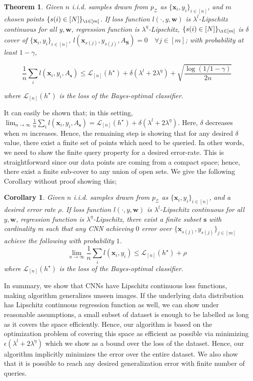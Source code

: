 \documentclass{article}
\newtheorem{theorem}{Theorem}
\newtheorem{cor}{Corollary}
\begin{document}
\begin{theorem}
Given $n$ i.i.d. samples drawn from $p_\mathcal{Z}$ as $\{\mathbf{x}_i,y_i\}_{i\in[n]}$, and $m$ chosen points $\{ s(i) \in [N]\}_{\i \in [m]}$. If loss function $l(\cdot,y,\mathbf{w})$ is $\lambda^l$-Lipschitz continuous for all $y, \mathbf{w}$, regression function is $\lambda^\eta$-Lipschitz, $\{ s(i) \in [N]\}_{\i \in [m]}$ is $\delta$ cover of $\{\mathbf{x}_i,y_i\}_{i\in[n]}$, $l(\mathbf{x}_{s(j)},y_{s(j)},A_\mathbf{S})=0\quad \forall j \in [m]$; with probability at least $1-\gamma$,
\begin{small}
\[
\frac{1}{n}\sum_i l(\mathbf{x}_i,y_i,A_\mathbf{s}) \leq \mathcal{L}_{[n]} (h^\star) +\delta(\lambda^l + 2 \lambda^{\eta}) + 
\sqrt{\frac{\log(1/1-\gamma)}{2n}}
\]
\end{small}
where $\mathcal{L}_{[n]} (h^\star)$ is the loss of the Bayes-optimal classifier.
\label{mainthm2}
\end{theorem}

It can easily be shown that; in this setting, $\lim_{n \rightarrow \infty} \frac{1}{n}\sum_i l(\mathbf{x}_i,y_i,A_\mathbf{s}) =   \mathcal{L}_{[n]} (h^\star) +\delta(\lambda^l + 2 \lambda^{\eta})$. Here, $\delta$ decreases when $m$ increases. Hence, the remaining step is showing that for any desired $\delta$ value, there exist a finite set of points which need to be queried. In other words, we need to show the finite query property for a desired error-rate. This is straightforward since our data points are coming from a compact space; hence, there exist a finite sub-cover to any union of open sets. We give the following Corollary without proof showing this;

\begin{cor}
Given $n$ i.i.d. samples drawn from $p_\mathcal{Z}$ as $\{\mathbf{x}_i,y_i\}_{i\in[n]}$, and a desired error rate $\rho$. If loss function $l(\cdot,y,\mathbf{w})$ is $\lambda^l$-Lipschitz continuous for all $y, \mathbf{w}$, regression function is $\lambda^\eta$-Lipschitz, there exist a finite subset $\mathbf{s}$ with cardinality m such that any CNN achieving $0$ error over $\{\mathbf{x}_{s(j)},y_{s(j)}\}_{j \in [m]}$ achieve the following with probability $1$.
\[
\lim_{n \rightarrow \infty} \frac{1}{n}\sum_i l(\mathbf{x}_i,y_i) \leq \mathcal{L}_{[n]} (h^\star) +\rho
\]
where $\mathcal{L}_{[n]} (h^\star)$ is the loss of the Bayes-optimal classifier.
\label{maincor}
\end{cor}

In summary, we show that CNNs have Lipschitz continuous loss functions, making algorithm generalizes unseen images. If the underlying data distribution has Lipschitz continuous regression function as well, we can show under reasonable assumptions, a small subset of dataset is enough to be labelled as long as it covers the space efficiently. Hence, our algorithm is based on the optimization problem of covering this space as efficient as possible via minimizing $\epsilon(\lambda^l + 2 \lambda^{\eta})$ which we show as a bound over the loss of the dataset. Hence, our algorithm implicitly minimizes the error over the entire dataset. We also show that it is possible to reach any desired generalization error with finite number of queries.
\end{document}

